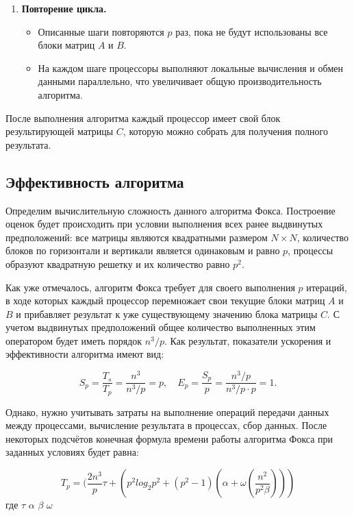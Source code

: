 \documentclass{report}
\begin{document}
\begin{enumerate}
    \item \textbf{Повторение цикла.} 
    \begin{itemize}
        \item Описанные шаги повторяются \(p\) раз, пока не будут использованы все блоки матриц \(A\) и \(B\).
        \item На каждом шаге процессоры выполняют локальные вычисления и обмен данными параллельно, что увеличивает общую производительность алгоритма.
    \end{itemize}
\end{enumerate}

После выполнения алгоритма каждый процессор имеет свой блок результирующей матрицы \(C\), которую можно собрать для получения полного результата.

\subsection*{Эффективность алгоритма}
Определим вычислительную сложность данного алгоритма Фокса. Построение оценок будет происходить при условии выполнения всех ранее выдвинутых предположений: все матрицы являются квадратными размером \(N \times N\), количество блоков по горизонтали и вертикали является одинаковым и равно \(p\), процессы образуют квадратную решетку и их количество равно \(p^2\).

Как уже отмечалось, алгоритм Фокса требует для своего выполнения \(p\) итераций, в ходе которых каждый процессор перемножает свои текущие блоки матриц \(A\) и \(B\) и прибавляет результат к уже существующему значению блока матрицы \(C\). С учетом выдвинутых предположений общее количество выполненных этим оператором будет иметь порядок \(n^3/p\). Как результат, показатели ускорения и эффективности алгоритма имеют вид:

\[
S_p = \frac{T_s}{T_p} = \frac{n^3}{n^3 / p} = p, \quad E_p = \frac{S_p}{p} = \frac{n^3 / p}{n^3 / p \cdot p} = 1.
\]

Однако, нужно учитывать затраты на выполнение операций передачи данных между процессами, вычисление результата в процессах, сбор данных. После некоторых подсчётов конечная формула времени работы алгоритма Фокса при заданных условиях будет равна:

\[
T_p=(\frac{2n^3}{p}\tau + (p^2log_2p^2 + (p^2-1)(\alpha+\omega(\frac{n^2}{p^2\beta})))
\]
где $\tau$  
$\alpha$  \newline
$\beta$  
$\omega$ 
\end{document}
